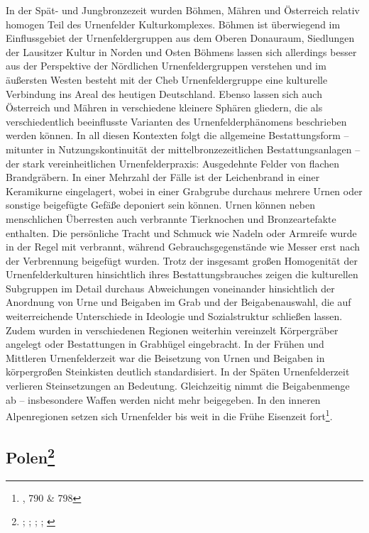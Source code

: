 \documentclass[openany,twoside,twocolumn]{book}
\let\rmarkdownfootnote\footnote%
\def\footnote{\protect\rmarkdownfootnote}
\begin{document}
In der Spät- und Jungbronzezeit wurden Böhmen, Mähren und Österreich
relativ homogen Teil des Urnenfelder Kulturkomplexes. Böhmen ist
überwiegend im Einflussgebiet der Urnenfeldergruppen aus dem Oberen
Donauraum, Siedlungen der Lausitzer Kultur in Norden und Osten Böhmens
lassen sich allerdings besser aus der Perspektive der Nördlichen
Urnenfeldergruppen verstehen und im äußersten Westen besteht mit der
Cheb Urnenfeldergruppe eine kulturelle Verbindung ins Areal des heutigen
Deutschland. Ebenso lassen sich auch Österreich und Mähren in
verschiedene kleinere Sphären gliedern, die als verschiedentlich
beeinflusste Varianten des Urnenfelderphänomens beschrieben werden
können. In all diesen Kontexten folgt die allgemeine Bestattungsform --
mitunter in Nutzungskontinuität der mittelbronzezeitlichen
Bestattungsanlagen -- der stark vereinheitlichen Urnenfelderpraxis:
Ausgedehnte Felder von flachen Brandgräbern. In einer Mehrzahl der Fälle
ist der Leichenbrand in einer Keramikurne eingelagert, wobei in einer
Grabgrube durchaus mehrere Urnen oder sonstige beigefügte Gefäße
deponiert sein können. Urnen können neben menschlichen Überresten auch
verbrannte Tierknochen und Bronzeartefakte enthalten. Die persönliche
Tracht und Schmuck wie Nadeln oder Armreife wurde in der Regel mit
verbrannt, während Gebrauchsgegenstände wie Messer erst nach der
Verbrennung beigefügt wurden. Trotz der insgesamt großen Homogenität der
Urnenfelderkulturen hinsichtlich ihres Bestattungsbrauches zeigen die
kulturellen Subgruppen im Detail durchaus Abweichungen voneinander
hinsichtlich der Anordnung von Urne und Beigaben im Grab und der
Beigabenauswahl, die auf weiterreichende Unterschiede in Ideologie und
Sozialstruktur schließen lassen. Zudem wurden in verschiedenen Regionen
weiterhin vereinzelt Körpergräber angelegt oder Bestattungen in
Grabhügel eingebracht. In der Frühen und Mittleren Urnenfelderzeit war
die Beisetzung von Urnen und Beigaben in körpergroßen Steinkisten
deutlich standardisiert. In der Späten Urnenfelderzeit verlieren
Steinsetzungen an Bedeutung. Gleichzeitig nimmt die Beigabenmenge ab --
insbesondere Waffen werden nicht mehr beigegeben. In den inneren
Alpenregionen setzen sich Urnenfelder bis weit in die Frühe Eisenzeit
fort\footnote{\textcite{lubos_czech_2013}, 790 \& 798}.

\hypertarget{polen}{%
\subsection[Polen]{\texorpdfstring{Polen\footnote{\textcite{dabrowski_aeltere_2004};
  \textcite{czebreszuk_bronze_2013};
  \textcite{czebreszuk_northeast_2003};
  \textcite{machnik_fruhbronzezeit_1977};
  \textcite{muller_bruszczewo_2004}}}{Polen}}\label{polen}}
\end{document}
